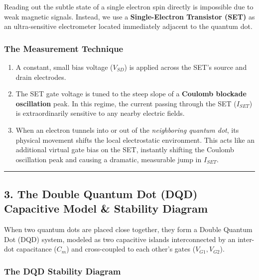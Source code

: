 \documentclass[
]{article}
\providecommand{\tightlist}{%
  \setlength{\itemsep}{0pt}\setlength{\parskip}{0pt}}
\begin{document}
Reading out the subtle state of a single electron spin directly is
impossible due to weak magnetic signals. Instead, we use a
\textbf{Single-Electron Transistor (SET)} as an ultra-sensitive
electrometer located immediately adjacent to the quantum dot.

\subsubsection{The Measurement
Technique}\label{the-measurement-technique}

\begin{enumerate}
\def\labelenumi{\arabic{enumi}.}
\tightlist
\item
  A constant, small bias voltage (\(V_{SD}\)) is applied across the
  SET's source and drain electrodes.
\item
  The SET gate voltage is tuned to the steep slope of a \textbf{Coulomb
  blockade oscillation} peak. In this regime, the current passing
  through the SET (\(I_{SET}\)) is extraordinarily sensitive to any
  nearby electric fields.
\item
  When an electron tunnels into or out of the \emph{neighboring quantum
  dot}, its physical movement shifts the local electrostatic
  environment. This acts like an additional virtual gate bias on the
  SET, instantly shifting the Coulomb oscillation peak and causing a
  dramatic, measurable jump in \(I_{SET}\).
\end{enumerate}

\begin{center}\rule{0.5\linewidth}{0.5pt}\end{center}

\subsection{3. The Double Quantum Dot (DQD) Capacitive Model \&
Stability
Diagram}\label{the-double-quantum-dot-dqd-capacitive-model-stability-diagram}

When two quantum dots are placed close together, they form a Double
Quantum Dot (DQD) system, modeled as two capacitive islands
interconnected by an inter-dot capacitance (\(C_m\)) and cross-coupled
to each other's gates (\(V_{G1}, V_{G2}\)).

\subsubsection{The DQD Stability
Diagram}\label{the-dqd-stability-diagram}
\end{document}
